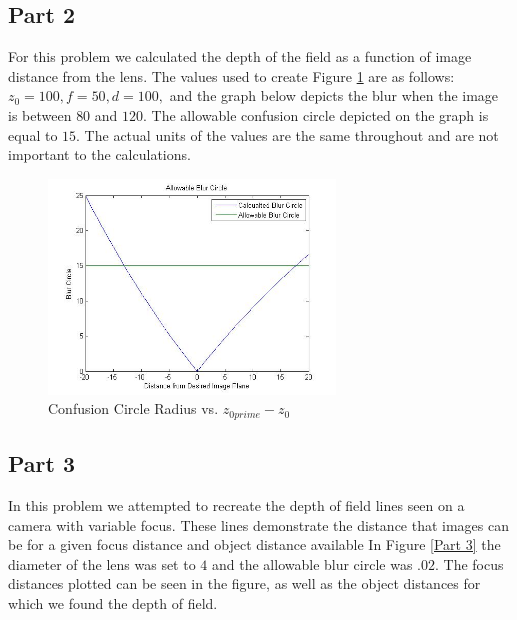 \documentclass[paper=a4, fontsize=11pt]{scrartcl} %
\numberwithin{equation}{section} %
\numberwithin{figure}{section} %
\numberwithin{table}{section} %
\begin{document}
\subsection{Part 2}
For this problem we calculated the depth of the field as a function of image distance from the lens.
The values used to create Figure \ref{Part 2} are as follows: \begin{math}z_{0} = 100, f = 50, d = 100,\end{math} and the graph below depicts the blur when the image is between \begin{math}80\end{math} and \begin{math}120\end{math}.
The allowable confusion circle depicted on the graph is equal to \begin{math}15\end{math}.
The actual units of the values are the same throughout and are not important to the calculations.

\begin{figure}
\centering
\includegraphics[width=3in]{prob12.jpg}
\caption{Confusion Circle Radius vs. \begin{math}z_{0prime}-z_{0}\end{math}}
\label{Part 2}
\end{figure} 

\subsection{Part 3}

In this problem we attempted to recreate the depth of field lines seen on a camera with variable focus.
These lines demonstrate the distance that images can be for a given focus distance and object distance available
In Figure \ref{Part 3} the diameter of the lens was set to \begin{math}4\end{math} and the allowable blur circle was \begin{math}.02\end{math}.
The focus distances plotted can be seen in the figure, as well as the object distances for which we found the depth of field.
\end{document}
